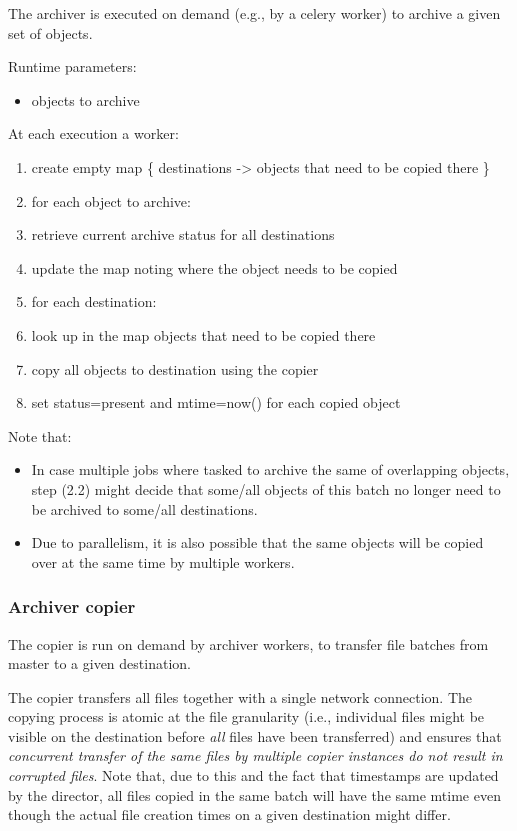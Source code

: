The archiver is executed on demand (e.g., by a celery worker) to archive
a given set of objects.

Runtime parameters:

\begin{itemize}
\itemsep1pt\parskip0pt
\item
  objects to archive
\end{itemize}

At each execution a worker:

\begin{enumerate}
\def\labelenumi{\arabic{enumi}.}
\itemsep1pt\parskip0pt
\item
  create empty map \{ destinations -\textgreater{} objects that need to
  be copied there \}
\item
  for each object to archive:
\item
  retrieve current archive status for all destinations
\item
  update the map noting where the object needs to be copied
\item
  for each destination:
\item
  look up in the map objects that need to be copied there
\item
  copy all objects to destination using the copier
\item
  set status=present and mtime=now() for each copied object
\end{enumerate}

Note that:

\begin{itemize}
\item
  In case multiple jobs where tasked to archive the same of overlapping
  objects, step (2.2) might decide that some/all objects of this batch
  no longer need to be archived to some/all destinations.
\item
  Due to parallelism, it is also possible that the same objects will be
  copied over at the same time by multiple workers.
\end{itemize}

\subsubsection{Archiver copier}\label{archiver-copier}

The copier is run on demand by archiver workers, to transfer file
batches from master to a given destination.

The copier transfers all files together with a single network
connection. The copying process is atomic at the file granularity (i.e.,
individual files might be visible on the destination before \emph{all}
files have been transferred) and ensures that \emph{concurrent transfer
of the same files by multiple copier instances do not result in
corrupted files}. Note that, due to this and the fact that timestamps
are updated by the director, all files copied in the same batch will
have the same mtime even though the actual file creation times on a
given destination might differ.

